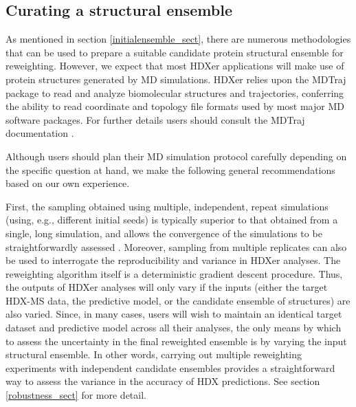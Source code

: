\documentclass[9pt,tutorial]{livecoms}
\begin{document}
\subsection{Curating a structural ensemble}
As mentioned in section \ref{initialensemble_sect}, there are numerous methodologies that can be used to prepare a suitable candidate protein structural ensemble for reweighting.
However, we expect that most HDXer applications will make use of protein structures generated by MD simulations.
HDXer relies upon the MDTraj package to read and analyze biomolecular structures and trajectories, conferring the ability to read coordinate and topology file formats used by most major MD software packages.
For further details users should consult the MDTraj documentation \cite{McGibbon2015MDTraj}.

Although users should plan their MD simulation protocol carefully depending on the specific question at hand, we make the following general recommendations based on our own experience.

First, the sampling obtained using multiple, independent, repeat simulations (using, e.g., different initial seeds) is typically superior to that obtained from a single, long simulation, and allows the convergence of the simulations to be straightforwardly assessed \cite{Hess2002,Faraldo-Gomez2004,Grossfield2019}.
Moreover, sampling from multiple replicates can also be used to interrogate the reproducibility and variance in HDXer analyses.
The reweighting algorithm itself is a deterministic gradient descent procedure.
Thus, the outputs of HDXer analyses will only vary if the inputs (either the target HDX-MS data, the predictive model, or the candidate ensemble of structures) are also varied.
Since, in many cases, users will wish to maintain an identical target dataset and predictive model across all their analyses, the only means by which to assess the uncertainty in the final reweighted ensemble is by varying the input structural ensemble.
In other words, carrying out multiple reweighting experiments with independent candidate ensembles provides a straightforward way to assess the variance in the accuracy of HDX predictions. 
See section \ref{robustness_sect} for more detail.
\end{document}
